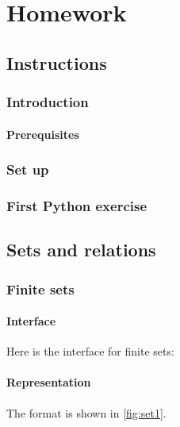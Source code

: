 \part{Homework}


\chapter{Instructions}


\section{Introduction}

\subsection{Prerequisites}


\section{Set up}



\section{First Python exercise}



\chapter{Sets and relations}


\section{Finite sets}

\subsection{Interface}
Here is the interface for finite sets:
%

%

\subsection{Representation}
The format is shown in \cref{fig:set1}.

